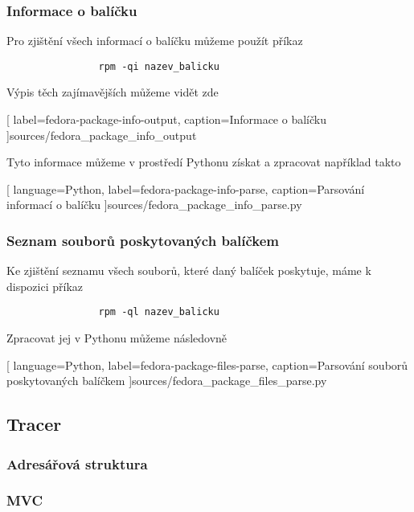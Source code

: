 \documentclass[10pt,a4paper]{article}
\begin{document}

			\subsubsection{Informace o balíčku}
			Pro zjištění všech informací o balíčku můžeme použít příkaz

			\begin{lstlisting}
				rpm -qi nazev_balicku
			\end{lstlisting}

			Výpis těch zajímavějších můžeme vidět zde
			
			[
				label=fedora-package-info-output,
				caption={Informace o balíčku}
			]{sources/fedora_package_info_output}

			Tyto informace můžeme v prostředí Pythonu získat a zpracovat například takto
			
			[
				language=Python,
				label=fedora-package-info-parse,
				caption={Parsování informací o balíčku}
			]{sources/fedora_package_info_parse.py}

			\subsubsection{Seznam souborů poskytovaných balíčkem}
			Ke zjištění seznamu všech souborů, které daný balíček poskytuje, máme k dispozici příkaz

			\begin{lstlisting}
				rpm -ql nazev_balicku
			\end{lstlisting}

			Zpracovat jej v Pythonu můžeme následovně

			
			[
				language=Python,
				label=fedora-package-files-parse,
				caption={Parsování souborů poskytovaných balíčkem}
			]{sources/fedora_package_files_parse.py}

		\subsection{Tracer}
			\subsubsection{Adresářová struktura}
			\subsubsection{MVC}
\end{document}
